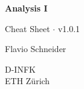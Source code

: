 \documentclass[8pt,a4paper]{extarticle}     %
\theoremstyle{definition}
\theoremstyle{definition}
\theoremstyle{definition}
\begin{document}
\begin{titlepage}
    \begin{center}
		\vspace*{1cm}

		\Huge
        \textbf{Analysis I}

		\vspace{0.5cm}
		\Large
        Cheat Sheet $\cdot$ v1.0.1

        \vfill

        Flavio Schneider

		\vspace{0.8cm}

        D-INFK\\
        ETH Zürich
    \end{center}
\end{titlepage}
\end{document}
